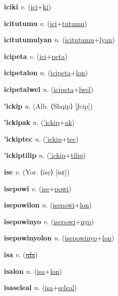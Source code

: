 \textbf{\hypertarget{iciki}{iciki}} \textit{v.} (\hyperlink{ici}{ici}+\allowbreak \hyperlink{ki}{ki})


\textbf{\hypertarget{icitutumu}{icitutumu}} \textit{v.} (\hyperlink{ici}{ici}+\allowbreak \hyperlink{tutumu}{tutumu})


\textbf{\hypertarget{icitutumulyan}{icitutumulyan}} \textit{n.} (\hyperlink{icitutumu}{icitutumu}+\allowbreak \hyperlink{lyan}{lyan})


\textbf{\hypertarget{icipeta}{icipeta}} \textit{v.} (\hyperlink{ici}{ici}+\allowbreak \hyperlink{peta}{peta})


\textbf{\hypertarget{icipetalon}{icipetalon}} \textit{n.} (\hyperlink{icipeta}{icipeta}+\allowbreak \hyperlink{lon}{lon})


\textbf{\hypertarget{icipetalwel}{icipetalwel}} \textit{n.} (\hyperlink{icipeta}{icipeta}+\allowbreak \hyperlink{lwel}{lwel})


\textbf{\hypertarget{'ickip}{'ickip}} \textit{n.} (Alb. ⟨Shqip⟩ [ʃcip])


\textbf{\hypertarget{'ickipak}{'ickipak}} \textit{n.} (\hyperlink{'ickip}{'ickip}+\allowbreak \hyperlink{ak}{ak})


\textbf{\hypertarget{'ickiptec}{'ickiptec}} \textit{n.} (\hyperlink{'ickip}{'ickip}+\allowbreak \hyperlink{tec}{tec})


\textbf{\hypertarget{'ickiptilip}{'ickiptilip}} \textit{n.} (\hyperlink{'ickip}{'ickip}+\allowbreak \hyperlink{tilip}{tilip})


\textbf{\hypertarget{ise}{ise}} \textit{v.} (Yor. ⟨isẹ⟩ [isɛ])


\textbf{\hypertarget{isepowi}{isepowi}} \textit{v.} (\hyperlink{ise}{ise}+\allowbreak \hyperlink{powi}{powi})


\textbf{\hypertarget{isepowilon}{isepowilon}} \textit{n.} (\hyperlink{isepowi}{isepowi}+\allowbreak \hyperlink{lon}{lon})


\textbf{\hypertarget{isepowinyo}{isepowinyo}} \textit{v.} (\hyperlink{isepowi}{isepowi}+\allowbreak \hyperlink{nyo}{nyo})


\textbf{\hypertarget{isepowinyolon}{isepowinyolon}} \textit{n.} (\hyperlink{isepowinyo}{isepowinyo}+\allowbreak \hyperlink{lon}{lon})


\textbf{\hypertarget{isa}{isa}} \textit{v.} (\hyperlink{ufa}{\sout{ufa}})


\textbf{\hypertarget{isalon}{isalon}} \textit{n.} (\hyperlink{isa}{isa}+\allowbreak \hyperlink{lon}{lon})


\textbf{\hypertarget{isaseleal}{isaseleal}} \textit{n.} (\hyperlink{isa}{isa}+\allowbreak \hyperlink{seleal}{seleal})


